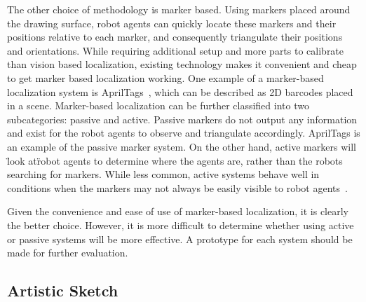 The other choice of methodology is marker based. Using markers placed around the drawing surface, robot agents can quickly locate these markers and their positions relative to each marker, and consequently triangulate their positions and orientations. While requiring additional setup and more parts to calibrate than vision based localization, existing technology makes it convenient and cheap to get marker based localization working. One example of a marker-based localization system is AprilTags~\cite{olson2011apriltag}, which can be described as 2D barcodes placed in a scene. Marker-based localization can be further classified into two subcategories: passive and active. Passive markers do not output any information and exist for the robot agents to observe and triangulate accordingly. AprilTags is an example of the passive marker system. On the other hand, active markers will \"look at\" robot agents to determine where the agents are, rather than the robots searching for markers. While less common, active systems behave well in conditions when the markers may not always be easily visible to robot agents~\cite{cassinis2005active}.

Given the convenience and ease of use of marker-based localization, it is clearly the better choice. However, it is more difficult to determine whether using active or passive systems will be more effective. A prototype for each system should be made for further evaluation.


\subsection{Artistic Sketch}